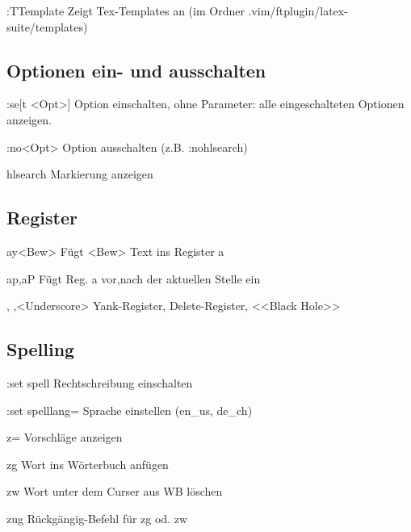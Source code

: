 \documentclass{scrartcl}
\begin{document}
\begin{multicols}{2}
\begin{description*}
  \item[:TTemplate] Zeigt Tex-Templates an (im Ordner .vim/ftplugin/latex-suite/templates)
\end{description*}

\subsection*{Optionen ein- und ausschalten}

\begin{description*}
  \item[:se[t] <Opt>] Option einschalten, ohne Parameter: alle eingeschalteten Optionen anzeigen.
  \item[:no<Opt>] Option ausschalten (z.B. :nohlsearch)
  \item[hlsearch] Markierung anzeigen
\end{description*}

\subsection*{Register}

\begin{description*}
  \item[\dq ay<Bew>] Fügt <Bew> Text ins Register a
  \item[\dq ap,\dq aP] Fügt Reg. a vor,nach der aktuellen Stelle ein
  \item[\dq\dq, \dq0,\dq<Underscore>] Yank-Register, Delete-Register, <<Black Hole>>
\end{description*}

\subsection*{Spelling}

\begin{description*}
	\item[:set spell] Rechtschreibung einschalten
	\item[:set spelllang=] Sprache einstellen (en\_us, de\_ch)
	\item[z=] Vorschläge anzeigen
	\item[zg] Wort ins Wörterbuch anfügen
	\item[zw] Wort unter dem Curser aus WB löschen
	\item[zug] Rückgängig-Befehl für zg od. zw
\end{description*}

\end{multicols}
\end{document}
